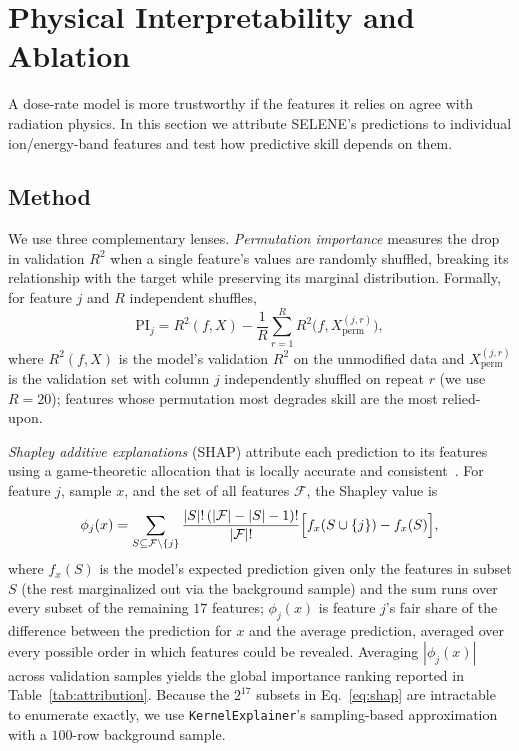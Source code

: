 \documentclass[graybox]{SNmult}
\begin{document}
\section{Physical Interpretability and Ablation}
\label{sec:interp}

A dose-rate model is more trustworthy if the features it relies on agree with
radiation physics. In this section we attribute SELENE's predictions to
individual ion/energy-band features and test how predictive skill depends on
them.

\subsection{Method}
We use three complementary lenses. \emph{Permutation importance} measures the
drop in validation $R^2$ when a single feature's values are randomly shuffled,
breaking its relationship with the target while preserving its marginal
distribution. Formally, for feature $j$ and $R$ independent shuffles,
\begin{equation}
  \mathrm{PI}_j = R^2(f, X) - \frac{1}{R}\sum_{r=1}^{R} R^2\bigl(f, X^{(j,r)}_{\text{perm}}\bigr),
  \label{eq:perm-importance}
\end{equation}
where $R^2(f, X)$ is the model's validation $R^2$ on the unmodified data and
$X^{(j,r)}_{\text{perm}}$ is the validation set with column $j$ independently
shuffled on repeat $r$ (we use $R=20$); features whose permutation most
degrades skill are the most relied-upon.

\emph{Shapley additive explanations} (SHAP) attribute each prediction to its
features using a game-theoretic allocation that is locally accurate and
consistent~\cite{lundberg2017shap}. For feature $j$, sample $x$, and the set of
all features $\mathcal{F}$, the Shapley value is
\begin{equation}
  \phi_j(x) = \sum_{S \subseteq \mathcal{F}\setminus\{j\}}
    \frac{|S|!\,(|\mathcal{F}|-|S|-1)!}{|\mathcal{F}|!}
    \Bigl[f_x(S \cup \{j\}) - f_x(S)\Bigr],
  \label{eq:shap}
\end{equation}
where $f_x(S)$ is the model's expected prediction given only the features in
subset $S$ (the rest marginalized out via the background sample) and the sum
runs over every subset of the remaining $17$ features; $\phi_j(x)$ is feature
$j$'s fair share of the difference between the prediction for $x$ and the
average prediction, averaged over every possible order in which features could
be revealed. Averaging $|\phi_j(x)|$ across validation samples yields the
global importance ranking reported in Table~\ref{tab:attribution}. Because the
$2^{17}$ subsets in Eq.~\ref{eq:shap} are intractable to enumerate exactly,
we use \texttt{KernelExplainer}'s sampling-based approximation with a
$100$-row background sample.
\end{document}
